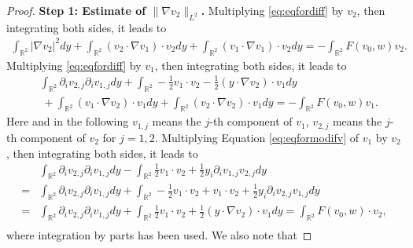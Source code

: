 \documentclass[12pt]{amsart}
\numberwithin{equation}{section}              %
\theoremstyle{remark}
\begin{document}
		\begin{proof}
			\textbf{Step 1:  Estimate of $\|\nabla v_2\|_{L^2}$.}
			Multiplying \eqref{eq:eqfordiff} by $v_2$, then integrating both sides, it leads to
			\begin{equation}\label{eq:sum1}
				\begin{aligned}
					\int_{\mathbb{R}^2} |\nabla v_2|^2 dy   + \int_{\mathbb{R}^2}  (v_2\cdot \nabla  v_1)\cdot v_2 dy +\int_{\mathbb{R}^2}  ( v_1\cdot\nabla  v_1)\cdot v_2 d y=-\int_{\mathbb{R}^2} F(v_0,w)v_2.
				\end{aligned}
			\end{equation}
			Multiplying \eqref{eq:eqfordiff} by $ v_1$, then integrating both sides, it leads to
			\begin{equation}\label{eq:sum2}
				\begin{aligned}
					&\int_{\mathbb{R}^2} \partial_i v_{2,j} \partial_i v_{1,j} dy   + \int_{\mathbb{R}^2}- \frac{1}{2} v_1\cdot v_2-\frac{1}{2}(y\cdot \nabla v_2)\cdot  v_1 dy \\
					&~ +
					\int_{\mathbb{R}^2}  ( v_1\cdot \nabla v_2)\cdot  v_1dy +\int_{\mathbb{R}^2}  (v_2\cdot\nabla v_2)\cdot  v_1 d y = -\int_{\mathbb{R}^2} F(v_0,w) v_1.
				\end{aligned}
			\end{equation}	
			Here and in the following $v_{1,j}$ means the $j$-th component of $v_1$,
			$v_{2,j}$ means the $j$-th component of $v_2$ for $j=1,2$.
			Multiplying  Equation \eqref{eq:eqformodifv}  of $ v_1$ by $v_2$, then integrating both sides, it leads to
			\begin{equation}\label{eq:sum3}
				\begin{aligned}
					&	 \int_{\mathbb{R}^2} \partial_i v_{2,j} \partial_i v_{1,j} dy -  \int_{\mathbb{R}^2} \frac{1}{2} v_1\cdot v_2+\frac{1}{2}y_i \partial_i v_{1,j} v_{2,j} dy \\
					=&\int_{\mathbb{R}^2} \partial_i v_{2,j} \partial_i v_{1,j} dy + \int_{\mathbb{R}^2} -\frac{1}{2} v_1\cdot v_2+  v_1\cdot v_2 +
					\frac{1}{2}y_i \partial_i v_{2,j} v_{1,j} dy \\
					=&\int_{\mathbb{R}^2} \partial_i v_{2,j} \partial_i v_{1,j} dy + \int_{\mathbb{R}^2} \frac{1}{2} v_1\cdot v_2 +
					\frac{1}{2}(y\cdot \nabla v_2)\cdot  v_1 dy =\int_{\mathbb{R}^2} F(v_0,w)\cdot v_2,\\
				\end{aligned}
			\end{equation}
            where integration by parts has been used.
			We also note that

\end{proof}
\end{document}
